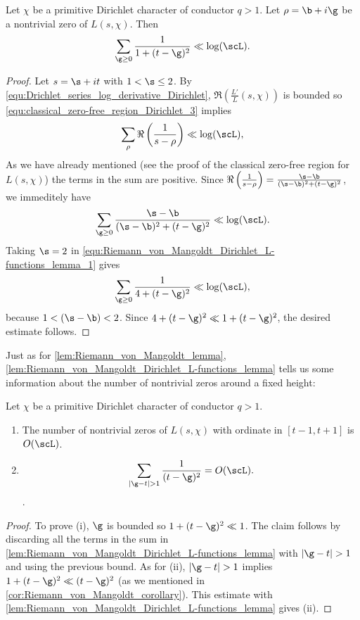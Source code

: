       \begin{lemma}\label{lem:Riemann_von_Mangoldt_Dirichlet_L-functions_lemma}
        Let $\chi$ be a primitive Dirichlet character of conductor $q > 1$. Let $\rho = \b+i\g$ be a nontrivial zero of $L(s,\chi)$. Then
        \[
          \sum_{\g \ge 0}\frac{1}{1+(t-\g)^{2}} \ll \log(\scL).
        \]
      \end{lemma}
      \begin{proof}
        Let $s = \s+it$ with $1 < \s \le 2$. By \cref{equ:Drichlet_series_log_derivative_Dirichlet}, $\Re\left(\frac{L'}{L}(s,\chi)\right)$ is bounded so \cref{equ:classical_zero-free_region_Dirichlet_3} implies
        \[
          \sum_{\rho}\Re\left(\frac{1}{s-\rho}\right) \ll \log(\scL),
        \]
        As we have already mentioned (see the proof of the classical zero-free region for $L(s,\chi)$) the terms in the sum are positive. Since $\Re\left(\frac{1}{s-\rho}\right) = \frac{\s-\b}{(\s-\b)^{2}+(t-\g)^{2}}$, we immeditely have
        \begin{equation}\label{equ:Riemann_von_Mangoldt_Dirichlet_L-functions_lemma_1}
          \sum_{\g \ge 0}\frac{\s-\b}{(\s-\b)^{2}+(t-\g)^{2}} \ll \log(\scL).
        \end{equation}
        Taking $\s = 2$ in \cref{equ:Riemann_von_Mangoldt_Dirichlet_L-functions_lemma_1} gives
        \[
          \sum_{\g \ge 0}\frac{1}{4+(t-\g)^{2}} \ll \log(\scL),
        \]
        because $1 < (\s-\b) < 2$. Since $4+(t-\g)^{2} \ll 1+(t-\g)^{2}$, the desired estimate follows.
      \end{proof}

      Just as for \cref{lem:Riemann_von_Mangoldt_lemma}, \cref{lem:Riemann_von_Mangoldt_Dirichlet_L-functions_lemma} tells us some information about the number of nontrivial zeros around a fixed height:

      \begin{corollary}\label{cor:Riemann_von_Mangoldt_Dirichlet_L-functions_corollary}
        Let $\chi$ be a primitive Dirichlet character of conductor $q > 1$.
        \begin{enumerate}[label=(\roman*)]
          \item The number of nontrivial zeros of $L(s,\chi)$ with ordinate in $[t-1,t+1]$ is $O(\scL)$.
          \item 
          \[
            \sum_{|\g-t| > 1}\frac{1}{(t-\g)^{2}} = O(\scL).
          \].
        \end{enumerate}
      \end{corollary}
      \begin{proof}
        To prove (i), $\g$ is bounded so $1+(t-\g)^{2} \ll 1$. The claim follows by discarding all the terms in the sum in \cref{lem:Riemann_von_Mangoldt_Dirichlet_L-functions_lemma} with $|\g-t| > 1$ and using the previous bound. As for (ii), $|\g-t| > 1$ implies $1+(t-\g)^{2} \ll (t-\g)^{2}$ (as we mentioned in \cref{cor:Riemann_von_Mangoldt_corollary}). This estimate with \cref{lem:Riemann_von_Mangoldt_Dirichlet_L-functions_lemma} gives (ii).
      \end{proof}


